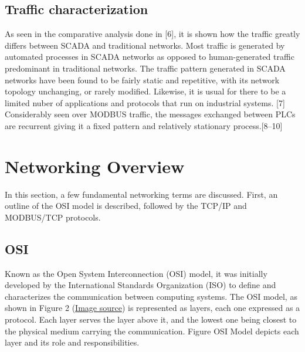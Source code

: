\documentclass[11pt,]{article}
\begin{document}
\subsection{Traffic characterization}\label{traffic-characterization}

As seen in the comparative analysis done in {[}6{]}, it is shown how the
traffic greatly differs between SCADA and traditional networks. Most
traffic is generated by automated processes in SCADA networks as opposed
to human-generated traffic predominant in traditional networks. The
traffic pattern generated in SCADA networks have been found to be fairly
static and repetitive, with its network topology unchanging, or rarely
modified. Likewise, it is usual for there to be a limited nuber of
applications and protocols that run on industrial systems. {[}7{]}
Considerably seen over MODBUS traffic, the messages exchanged between
PLCs are recurrent giving it a fixed pattern and relatively stationary
process.{[}8--10{]}

\newpage

\section{Networking Overview}\label{networking-overview}

In this section, a few fundamental networking terms are discussed.
First, an outline of the OSI model is described, followed by the TCP/IP
and MODBUS/TCP protocols.

\subsection{OSI}\label{osi}

Known as the Open System Interconnection (OSI) model, it was initially
developed by the International Standards Organization (ISO) to define
and characterizes the communication between computing systems. The OSI
model, as shown in Figure 2
(\href{https://engineering.linkedin.com/endorsements/geographic-trends-skills-using-linkedins-endorsement-feature}{Image
source}) is represented as layers, each one expressed as a protocol.
Each layer serves the layer above it, and the lowest one being closest
to the physical medium carrying the communication. Figure OSI Model
depicts each layer and its role and responsibilities.
\end{document}
